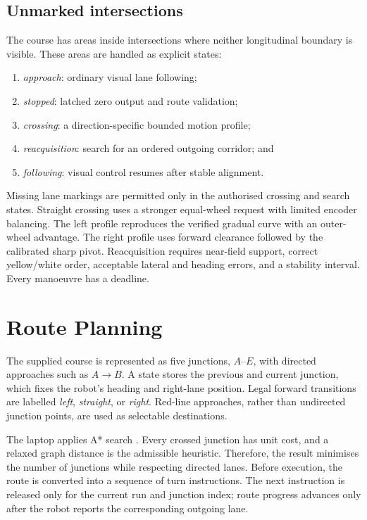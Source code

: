 \documentclass[10pt,a4paper,twocolumn]{article}
\begin{document}
\subsection{Unmarked intersections}

The course has areas inside intersections where neither longitudinal boundary
is visible. These areas are handled as explicit states:

\begin{enumerate}
    \item \emph{approach}: ordinary visual lane following;
    \item \emph{stopped}: latched zero output and route validation;
    \item \emph{crossing}: a direction-specific bounded motion profile;
    \item \emph{reacquisition}: search for an ordered outgoing corridor; and
    \item \emph{following}: visual control resumes after stable alignment.
\end{enumerate}

Missing lane markings are permitted only in the authorised crossing and search
states. Straight crossing uses a stronger equal-wheel request with limited
encoder balancing. The left profile reproduces the verified gradual curve with
an outer-wheel advantage. The right profile uses forward clearance followed by
the calibrated sharp pivot. Reacquisition requires near-field support, correct
yellow/white order, acceptable lateral and heading errors, and a stability
interval. Every manoeuvre has a deadline.

\section{Route Planning}

The supplied course is represented as five junctions, $A$--$E$, with directed
approaches such as $A\!\rightarrow\!B$. A state stores the previous and current
junction, which fixes the robot's heading and right-lane position. Legal forward transitions
are labelled \emph{left}, \emph{straight}, or
\emph{right}. Red-line approaches, rather than undirected junction points, are
used as selectable destinations.

The laptop applies A* search \cite{hart1968astar}. Every crossed junction has
unit cost, and a relaxed graph distance is the admissible heuristic. Therefore,
the result minimises the number of junctions while respecting directed lanes.
Before execution, the route is converted into a sequence of turn instructions.
The next instruction is released only for the current run and junction index;
route progress advances only after the robot reports the corresponding outgoing
lane.
\end{document}
